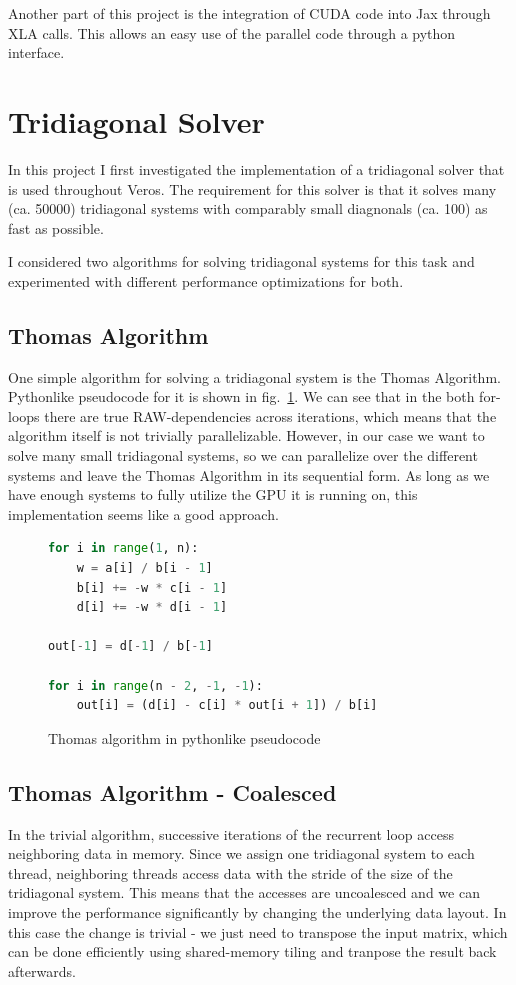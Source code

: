 \documentclass[a4paper,oneside]{memoir}
\begin{document}
Another part of this project is the integration of CUDA code into Jax through XLA calls.
This allows an easy use of the parallel code through a python interface.


\section{Tridiagonal Solver}
In this project I first investigated the implementation of a tridiagonal solver that is used throughout Veros. 
The requirement for this solver is that it solves many (ca. 50000) tridiagonal systems with comparably small diagnonals (ca. 100) as fast as possible.

I considered two algorithms for solving tridiagonal systems for this task and experimented with different performance optimizations for both.

\subsection{Thomas Algorithm}
One simple algorithm for solving a tridiagonal system is the Thomas Algorithm.
Pythonlike pseudocode for it is shown in fig.~\ref{fig:thomas}.
We can see that in the both for-loops there are true RAW-dependencies across iterations, which means that the algorithm itself is not trivially parallelizable.
However, in our case we want to solve many small tridiagonal systems, so we can parallelize over the different systems and leave the Thomas Algorithm in its sequential form.
As long as we have enough systems to fully utilize the GPU it is running on, this implementation seems like a good approach.

\begin{figure}[hbtp]
    \caption{Thomas algorithm in pythonlike pseudocode}
    \label{fig:thomas}
    \begin{lstlisting}[language=python,frame=single]
for i in range(1, n):
    w = a[i] / b[i - 1]
    b[i] += -w * c[i - 1]
    d[i] += -w * d[i - 1]

out[-1] = d[-1] / b[-1]

for i in range(n - 2, -1, -1):
    out[i] = (d[i] - c[i] * out[i + 1]) / b[i]
    \end{lstlisting}
\end{figure}


\subsection{Thomas Algorithm - Coalesced}
In the trivial algorithm, successive iterations of the recurrent loop access neighboring data in memory.
Since we assign one tridiagonal system to each thread, neighboring threads access data with the stride of the size of the tridiagonal system. This means that the accesses are uncoalesced and we can improve the performance significantly by changing the underlying data layout. 
In this case the change is trivial - we just need to transpose the input matrix, which can be done efficiently using shared-memory tiling and tranpose the result back afterwards. 
\end{document}
